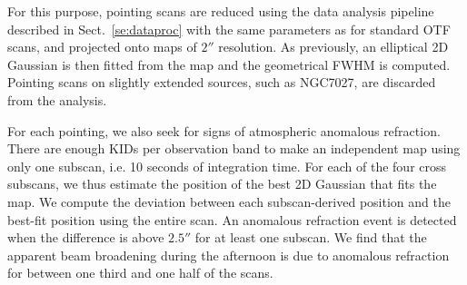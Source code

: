 For this purpose, pointing scans are reduced using
the data analysis pipeline described in
Sect.~\ref{se:dataproc} with the same parameters as for
standard OTF scans, and projected onto maps of $2''$ resolution.
As previously, an elliptical 2D Gaussian is then fitted from the map
and the geometrical FWHM%
is computed.
Pointing scans on {\lp slightly extended} sources, such as NGC7027,
are discarded from the analysis.


For each pointing, we also seek for signs of atmospheric anomalous refraction. There are
enough KIDs per observation band to make an independent map using only
one subscan, i.e. 10 seconds of integration time.
For each of the four cross subscans, we thus estimate the position of the best
2D Gaussian that fits the map. We compute the deviation between each
subscan-derived position and the best-fit position using the entire
scan. An anomalous refraction event is detected when the difference is
above $2.5''$ for at least one subscan. We find that the apparent beam
broadening during the afternoon is due to anomalous refraction for
between one third and one half of the scans.%

